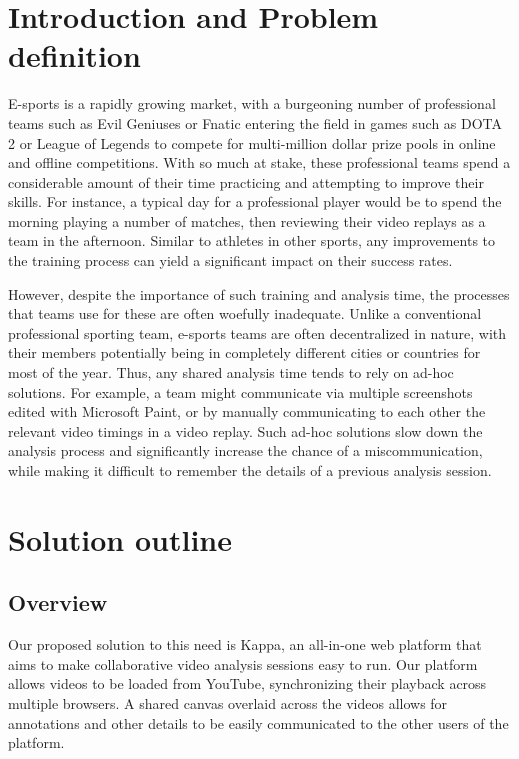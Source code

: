 \documentclass[conference]{IEEEtran}
\begin{document}
\section{Introduction and Problem definition}

  E-sports is a rapidly growing market, with a burgeoning number of professional teams such as Evil Geniuses or Fnatic entering the field in games such as DOTA 2 or League of Legends to compete for multi-million dollar prize pools in online and offline competitions. With so much at stake, these professional teams spend a considerable amount of their time practicing and attempting to improve their skills. For instance, a typical day for a professional player would be to spend the morning playing a number of matches, then reviewing their video replays as a team in the afternoon. Similar to athletes in other sports, any improvements to the training process can yield a significant impact on their success rates.

  However, despite the importance of such training and analysis time, the processes that teams use for these are often woefully inadequate. Unlike a conventional professional sporting team, e-sports teams are often decentralized in nature, with their members potentially being in completely different cities or countries for most of the year. Thus, any shared analysis time tends to rely on ad-hoc solutions. For example, a team might communicate via multiple screenshots edited with Microsoft Paint, or by manually communicating to each other the relevant video timings in a video replay. Such ad-hoc solutions slow down the analysis process and significantly increase the chance of a miscommunication, while making it difficult to remember the details of a previous analysis session.

\section{Solution outline}

\subsection{Overview}

  Our proposed solution to this need is Kappa, an all-in-one web platform that aims to make collaborative video analysis sessions easy to run. Our platform allows videos to be loaded from YouTube, synchronizing their playback across multiple browsers. A shared canvas overlaid across the videos allows for annotations and other details to be easily communicated to the other users of the platform.
\end{document}
